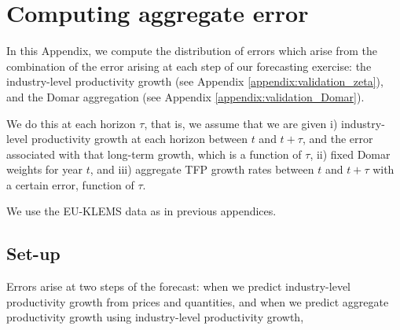
\section{Computing aggregate error}
\label{appendix:cross_error_aggregate}



In this Appendix, we compute the distribution of errors which arise from the combination of the error arising at each step of our forecasting exercise: the industry-level productivity growth (see Appendix \ref{appendix:validation_zeta}), and the Domar aggregation (see Appendix \ref{appendix:validation_Domar}).

We do this at each horizon $\tau$, that is, we assume that we are given i) industry-level productivity growth at each horizon between $t$ and $t+\tau$, and the error associated with that long-term growth, which is a function of $\tau$, ii) fixed Domar weights for year $t$, and iii) aggregate TFP growth rates between $t$ and $t+\tau$ with a certain error, function of $\tau$.

We use the EU-KLEMS data \citep{bontadiniEUKLEMSINTANProdIndustry2023} as in previous appendices.

\subsection{Set-up}


Errors arise at two steps of the forecast: when we predict industry-level productivity growth from prices and quantities, and when we predict aggregate productivity growth using industry-level productivity growth,

